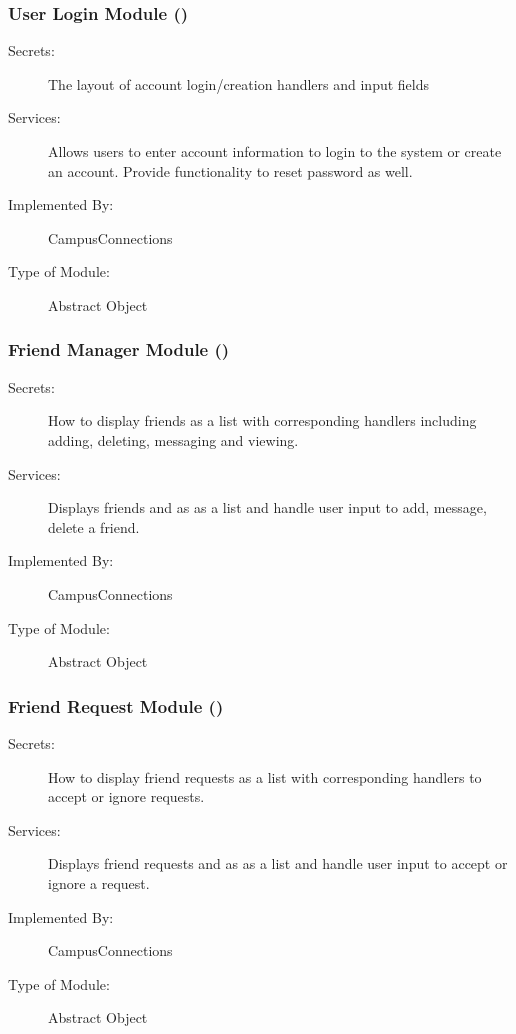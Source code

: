 \documentclass[12pt, titlepage]{article}
\begin{document}
  \subsubsection{User Login Module (\label{mUL})}
  \begin{description}
    \item[Secrets:]The layout of account login/creation handlers and input fields
    \item[Services:]Allows users to enter account information to login to the system or create an account. Provide functionality to reset password as well.
    \item[Implemented By:] CampusConnections
    \item[Type of Module:] Abstract Object
  \end{description}
  
  \subsubsection{Friend Manager Module (\label{mFM})}
  \begin{description}
  \item[Secrets:]How to display friends as a list with corresponding handlers including adding, deleting, messaging and viewing.
  \item[Services:]Displays friends and as as a list and handle user input to add, message, delete a friend.
  \item[Implemented By:] CampusConnections
  \item[Type of Module:] Abstract Object
  \end{description}
  
  \subsubsection{Friend Request Module (\label{mFR})}
  \begin{description}
  \item[Secrets:]How to display friend requests as a list with corresponding handlers to accept or ignore requests.
  \item[Services:]Displays friend requests and as as a list and handle user input to accept or ignore a request.
  \item[Implemented By:] CampusConnections
  \item[Type of Module:] Abstract Object
  \end{description}
  
\end{document}

